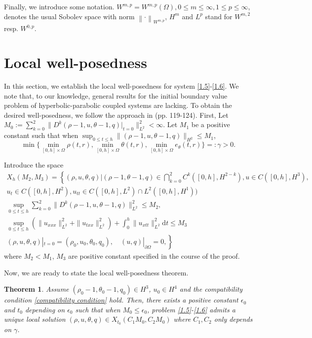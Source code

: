 \documentclass[11pt,reqno]{amsart}
\numberwithin{equation}{section}
\newtheorem{theorem}{Theorem}[section]
\newcommand{\dif}{\mathrm{d}}
\newcommand{\SUM}[3]{\sum\limits_{{#1}={#2}}^{#3}}
\begin{document}
Finally, we introduce some notation. $W^{m,p}=W^{m,p}(\Omega),0\le m\le \infty,1\le p\le \infty$, denotes the usual Sobolev space with norm $\left\| \cdot \right\|_{W^{m,p}}$, $H^m$ and $L^p$ stand for $ W^{m,2}$ resp. $W^{0,p}$.

 \section{Local well-posedness}

In this section, we establish the local well-posedness for system \eqref{1.5}-\eqref{1.6}. We note that, to our knowledge, general results for the initial boundary value problem of hyperbolic-parabolic coupled systems are lacking. To obtain the desired well-posedness, we follow the approach in \cite{Zheng} (pp. 119-124).
First, Let $M_0:=\SUM k 0 2 \| D^k(\rho-1, u, \theta-1, q)|_{t=0}\|_{L^2}^2 <\infty$. Let $M_1$ be a positive constant such that when $\sup_{0\le t\le h}\|(\rho-1, u, \theta-1, q)\|_{H^2} \le M_1$,
\[
\min \{ \min_{[0,h]\times \Omega} \rho(t,r), \min_{[0,h]\times \Omega}  \theta (t,r), \min_{[0,h]\times \Omega}  e_{\theta}(t,r)\} =:\gamma >0.
\]

Introduce  the space
\begin{align*}
X_h(M_2, M_3)=\left\{ (\rho, u, \theta, q)| (\rho-1, \theta-1, q)\in \bigcap\limits_{k=0}^2 C^k([0,h], H^{2-k}), u\in C([0,h], H^3),\right.\\
u_t\in C([0,h], H^2), u_{tt} \in C([0,h], L^2) \cap L^2([0,h], H^1))\\
\sup_{0\le t\le h} \SUM k 0 2 \|D^k(\rho-1, u, \theta-1, q)\|_{L^2}^2 \le M_2,\\
\sup_{0\le t \le h} (\|u_{xxx}\|_{L^2}^2+\|u_{txx}\|_{L^2}^2 )+\int_0^h \|u_{xtt}\|_{L^2}^2 \dif t \le M_3\\
\left.(\rho, u, \theta, q)|_{t=0}=(\rho_0, u_0, \theta_0, q_0),\quad (u,q)|_{\partial \Omega}=0, \right\}
\end{align*}
where $M_2<M_1$, $M_3$ are positive constant specified in the course of the proof.

Now, we are ready to state the local well-posedness theorem.

\begin{theorem}\label{loc}
Assume $(\rho_0-1, \theta_0-1, q_0)\in H^{{3}}$,  $u_0\in H^4$ and the compatibility condition \eqref{compatibility condition} hold. Then,
there exists a positive constant $\epsilon_0$ and $t_0$ depending on $\epsilon_0$ such that when $M_0\le \epsilon_0$, problem  \eqref{1.5}-\eqref{1.6} admits a unique local solution
$(\rho, u, \theta, q)\in X_{t_0}(C_1 M_0, C_2M_0)$ where $C_1, C_2$ only depends on $\gamma$.
\end{theorem}
\end{document}
